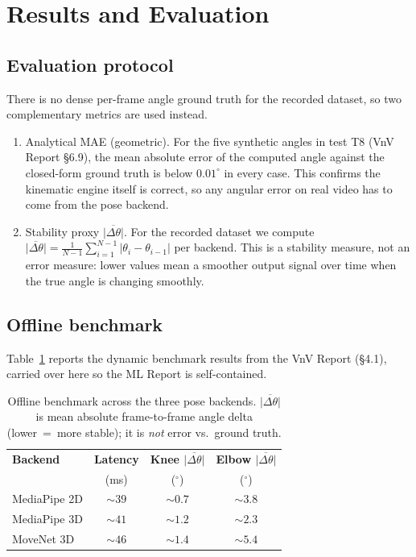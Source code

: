 \documentclass[11pt]{article}
\begin{document}
\section{Results and Evaluation}

\subsection{Evaluation protocol}

There is no dense per-frame angle ground truth for the recorded
dataset, so two complementary metrics are used instead.

\begin{enumerate}
  \item Analytical MAE (geometric). For the five synthetic angles in
    test T8 (VnV Report \S6.9), the mean absolute error of the
    computed angle against the closed-form ground truth is below
    $0.01^{\circ}$ in every case. This confirms the kinematic engine
    itself is correct, so any angular error on real video has to come
    from the pose backend.
  \item Stability proxy $\overline{|\Delta\theta|}$. For the recorded
    dataset we compute
    $\overline{|\Delta\theta|} = \frac{1}{N{-}1}\sum_{i=1}^{N-1}
    |\theta_i - \theta_{i-1}|$ per backend. This is a stability
    measure, not an error measure: lower values mean a smoother
    output signal over time when the true angle is changing smoothly.
\end{enumerate}

\subsection{Offline benchmark}

Table~\ref{tab:benchmark} reports the dynamic benchmark results from
the VnV Report (\S4.1), carried over here so the ML Report is
self-contained.

\begin{table}[h]
  \centering
  \begin{tabular}{lccc}
    \toprule
    \textbf{Backend} & \textbf{Latency} & \textbf{Knee $\overline{|\Delta\theta|}$} &
    \textbf{Elbow $\overline{|\Delta\theta|}$} \\
    & (ms) & ($^\circ$) & ($^\circ$) \\
    \midrule
    MediaPipe 2D & ${\sim}39$ & ${\sim}0.7$ & ${\sim}3.8$ \\
    MediaPipe 3D & ${\sim}41$ & ${\sim}1.2$ & ${\sim}2.3$ \\
    MoveNet 3D   & ${\sim}46$ & ${\sim}1.4$ & ${\sim}5.4$ \\
    \bottomrule
  \end{tabular}
  \caption{Offline benchmark across the three pose backends.
  $\overline{|\Delta\theta|}$ is mean absolute frame-to-frame angle
  delta (lower~=~more stable); it is \emph{not} error vs.\ ground
  truth.}
  \label{tab:benchmark}
\end{table}
\end{document}
